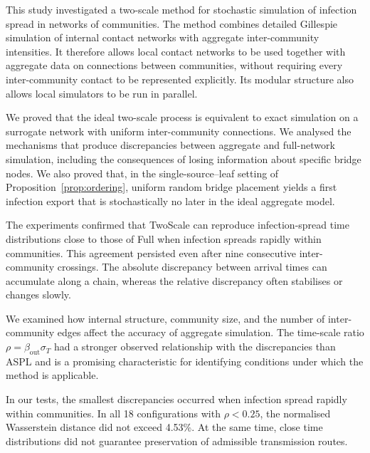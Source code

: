 \documentclass{ieeeaccess}
\newcommand{\michael}[2]{{\color{RoyalBlue}#1}}
\newcommand{\Full}{\textup{Full}}
\newcommand{\TS}{\textup{TwoScale}}
\begin{document}
This study investigated a two-scale method for stochastic simulation of infection spread in networks of communities. The method combines detailed Gillespie simulation of internal contact networks with aggregate inter-community intensities. It therefore allows local contact networks to be used together with aggregate data on connections between communities, without requiring every inter-community contact to be represented explicitly. Its modular structure also allows local simulators to be run in parallel.

We proved that the ideal two-scale process is equivalent to exact simulation on a surrogate network with uniform inter-community connections. We analysed the mechanisms that produce discrepancies between aggregate and full-network simulation, including the consequences of losing information about specific bridge nodes. \michael{We also proved that, in the single-source--leaf setting of Proposition~\ref{prop:ordering}, uniform random bridge placement yields a first infection export that is stochastically no later in the ideal aggregate model.}{We also proved that, when bridge nodes are placed uniformly at random, aggregation yields a first infection export that is stochastically no later in the ideal model.}

The experiments confirmed that \TS{} can reproduce infection-spread time distributions close to those of \Full{} when infection spreads rapidly within communities. This agreement persisted even after nine consecutive inter-community crossings. The absolute discrepancy between arrival times can accumulate along a chain, whereas the relative discrepancy often stabilises or changes slowly.

We examined how internal structure, community size, and the number of inter-community edges affect the accuracy of aggregate simulation. The time-scale ratio $\rho=\beta_{\mathrm{out}}\sigma_T$ had a stronger observed relationship with the discrepancies than ASPL and is a promising characteristic for identifying conditions under which the method is applicable.

In our tests, the smallest discrepancies occurred when infection spread rapidly within communities. In all 18 configurations with $\rho<0.25$, the normalised Wasserstein distance \michael{did not exceed 4.53\%}{did not exceed 4.5\%}. At the same time, close time distributions did not guarantee preservation of admissible transmission routes.


\end{document}
